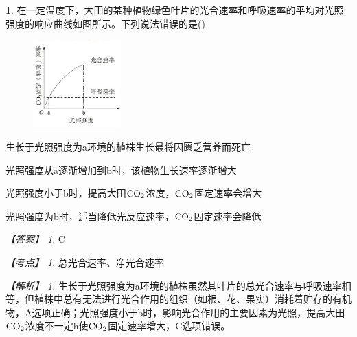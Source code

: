 \documentclass[UTF8, 10pt, a4paper, oneside]{ctexart}
\theoremstyle{definition}
\newtheorem{exercise}{}
\theoremstyle{remark}
\newtheorem*{answer}{【答案】}
\newtheorem*{point}{【考点】}      %
\newtheorem*{explanation}{【解析】}     %
\theoremstyle{plain}
\begin{document}
\begin{exercise}    
在一定温度下，大田的某种植物绿色叶片的光合速率和呼吸速率的平均对光照强度的响应曲线如图所示。下列说法错误的是\quad(\quad)
\begin{adjustwidth}{2em}{}\vspace{-3em}
    \begin{figure}[h!]
        \flushright
        \includegraphics[width=0.3\textwidth]{assists/2-1.jpg}
    \end{figure}\vspace{-15em}
        \begin{asparaenum}[A. ]
            \item 生长于光照强度为a环境的植株生长最将因匮乏营养而死亡
            \item 光照强度从a逐渐增加到b时，该植物生长速率逐渐增大
            \item 光照强度小于b时，提高大田$\ce{CO2}$浓度，$\ce{CO2}$固定速率会增大
            \item 光照强度为b时，适当降低光反应速率，$\ce{CO2}$固定速率会降低
        \end{asparaenum}\vspace{0.5em}
\end{adjustwidth}
\begin{answer}
    C
\end{answer}
\begin{point}
    总光合速率、净光合速率\vspace{0.5em}
\end{point}
\begin{explanation}
    生长于光照强度为a环境的植株虽然其叶片的总光合速率与呼吸速率相等，但植株中总有无法进行光合作用的组织（如根、花、果实）消耗着贮存的有机物，A选项正确；光照强度小于b时，影响光合作用的主要因素为光照，提高大田$\ce{CO2}$浓度不一定h使$\ce{CO2}$固定速率增大，C选项错误。
\end{explanation}
\end{exercise}
\end{document}
